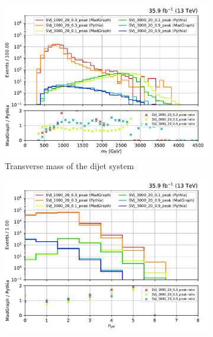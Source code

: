 \begin{figure}[htbp]
    \centering
    \begin{subfigure}[b]{0.49\textwidth}
        \includegraphics[width=\textwidth]{figures/madgraph_pythia_comparisons/plots/part1/dijet_mt.pdf}
        \caption{Transverse mass of the dijet system}
    \end{subfigure}
    \hfill
    \begin{subfigure}[b]{0.49\textwidth}
        \includegraphics[width=\textwidth]{figures/madgraph_pythia_comparisons/plots/part1/njet.pdf}
        \caption{\njet}
    \end{subfigure}


\end{figure}

